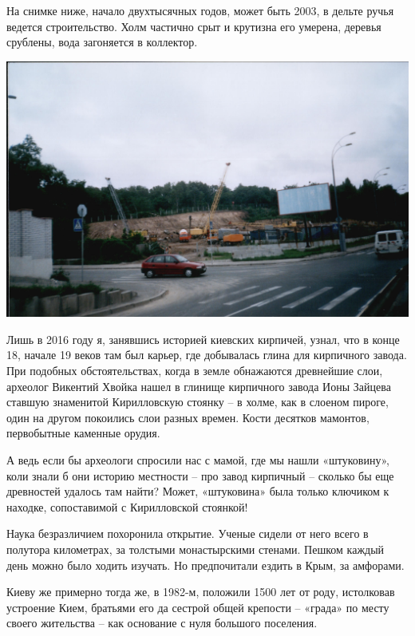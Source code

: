 На снимке ниже, начало двухтысячных годов, может быть 2003, в дельте ручья ведется строительство. Холм частично срыт и крутизна его умерена, деревья срублены, вода загоняется в коллектор.

\vspace*{\fill}

\begin{center}
\includegraphics[width=\linewidth]{chast-colebanie-osnov/nachalo/zverinec-niz.jpg}
\end{center}

\vspace*{\fill}

\newpage

Лишь в 2016 году я, занявшись историей киевских кирпичей, узнал, что в конце 18, начале 19 веков там был карьер, где добывалась глина для кирпичного завода. При подобных обстоятельствах, когда в земле обнажаются древнейшие слои, археолог Викентий Хвойка нашел в глинище кирпичного завода Ионы Зайцева ставшую знаменитой Кирилловскую стоянку – в холме, как в слоеном пироге, один на другом покоились слои разных времен. Кости десятков мамонтов, первобытные каменные орудия.
 
А ведь если бы археологи спросили нас с мамой, где мы нашли «штуковину», коли знали б они историю местности – про завод кирпичный – сколько бы еще древностей удалось там найти? Может, «штуковина» была только ключиком к находке, сопоставимой с Кирилловской стоянкой! 

Наука безразличием похоронила открытие. Ученые сидели от него всего в полутора километрах, за толстыми монастырскими стенами. Пешком каждый день можно было ходить изучать. Но предпочитали ездить в Крым, за амфорами.

Киеву же примерно тогда же, в 1982-м, положили 1500 лет от роду, истолковав устроение Кием, братьями его да сестрой общей крепости – «града» по месту своего жительства – как основание с нуля большого поселения.

